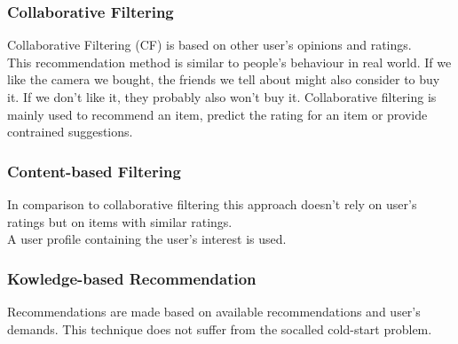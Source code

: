 \documentclass[runningheads,a4paper]{llncs}
\begin{document}
\subsubsection{Collaborative Filtering}
Collaborative Filtering (CF) is based on other user's opinions and ratings. \\
This recommendation method is similar to people's behaviour in real world. If we like the camera we bought, 
the friends we tell about might also consider to buy it. If we don't like it, they probably also won't buy it.
Collaborative filtering is mainly used to recommend an item, 
predict the rating for an item or provide contrained suggestions. \cite{schafer2007collaborative}
\subsubsection{Content-based Filtering}
In comparison to collaborative filtering this approach doesn't rely on user's ratings but 
on items with similar ratings. \\A user profile containing the user's interest is used. \cite{burke2002hybrid}
\subsubsection{Kowledge-based Recommendation}
Recommendations are made based on available recommendations and user's demands. This technique does not suffer from the socalled cold-start problem.\cite{burke2002hybrid}
\end{document}
